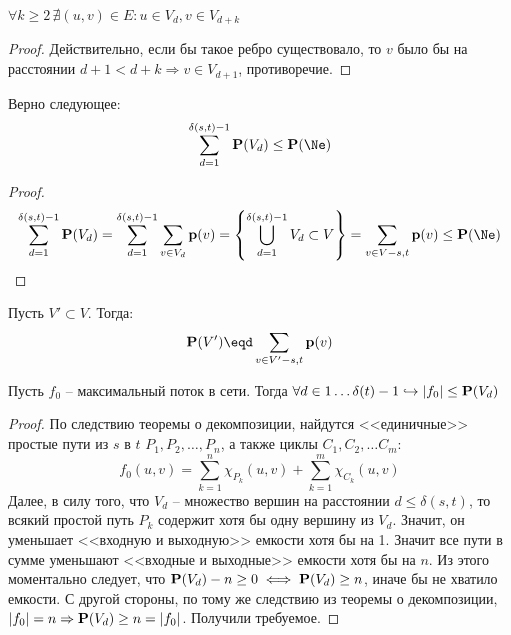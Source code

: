 \St $\forall k \geq 2 \, \nexists (u, v) \in E: u \in V_d, v \in V_{d+k}$
\begin{proof}
    
    Действительно, если бы такое ребро существовало, то $v$ было бы на расстоянии $d + 1 < d + k \Rightarrow v \in V_{d + 1}$, противоречие.

\end{proof}

\St Верно следующее:
\begin{equation*}
    \sum\limits_{d = 1}^{\delta(s, t) - 1} \P(V_d) \leq \P(\Ne) 
\end{equation*}
\begin{proof}
    \begin{equation*}
        \sum\limits_{d = 1}^{\delta(s, t) - 1} \P(V_d) = \sum\limits_{d = 1}^{\delta(s, t) - 1} \sum\limits_{v \in V_d} \p(v) = \left\{ \bigcup_{d = 1}^{\delta(s, t) - 1} V_d \subset V \right\} = \sum\limits_{v \in V - s, t} \p(v) \leq \P(\Ne)
    \end{equation*}
\end{proof}

\Def Пусть $V' \subset V$. Тогда:
\begin{equation*}
    \P(V') \eqd \sum\limits_{v \in V' - s, t} \p(v)
\end{equation*}

\St Пусть $f_0$ -- максимальный поток в сети. Тогда $\forall d \in 1 \dots \delta(t) - 1 \hookrightarrow |f_0| \leq \P(V_d)$
\begin{proof}
    
    По следствию теоремы о декомпозиции, найдутся <<единичные>> простые пути из $s$ в $t$ $P_1, P_2, \dots, P_n$, а также циклы $C_1, C_2, \dots C_m:$
    \begin{equation*}
        f_0(u, v) = \sum\limits_{k = 1}^n \chi_{P_k}(u, v) + \sum\limits_{k = 1}^m \chi_{C_k}(u, v)
    \end{equation*}
    Далее, в силу того, что $V_d$ -- множество вершин на расстоянии $d \leq \delta(s, t)$, то всякий простой путь $P_k$ содержит хотя бы одну вершину из $V_d$. Значит, он уменьшает <<входную и выходную>> емкости хотя бы на 1. Значит все пути в сумме уменьшают <<входные и выходные>> емкости хотя бы на $n$.
    Из этого моментально следует, что $\P(V_d) - n \geq 0 \iff \P(V_d) \geq n$, иначе бы не хватило емкости. С другой стороны, по тому же следствию из теоремы о декомпозиции, $|f_0| = n \Rightarrow \P(V_d) \geq n = |f_0|$. Получили требуемое.

\end{proof}

